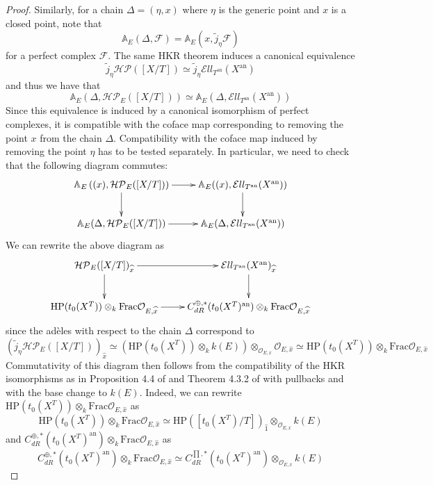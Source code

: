 \documentclass[11pt,letterpaper]{amsart}
\newcommand{\mHP}{\mathrm{HP}}
\newcommand{\bA}{\mathbb{A}}
\newcommand{\cF}{\mathcal{F}}
\newcommand{\cO}{\mathcal{O}}
\newcommand{\cHP}{\mathcal{HP}}
\newcommand{\El}{\mathcal{E}ll}
\newcommand{\an}{\mathrm{an}}
\newcommand{\Frac}{\mathrm{Frac}}
\begin{document}
\begin{proof}
Similarly, for a chain $\Delta=(\eta,x)$ where $\eta$ is the generic point and $x$ is a closed point, note that 
$$\bA_{E}(\Delta, \cF)=\bA_{E}(x, \tilde{j}_{\eta}\cF)$$
for a perfect complex $\cF$.
%
The same HKR theorem induces a canonical equivalence
$$\tilde{j}_{\eta}\cHP([X/T])\simeq\tilde{j}_{\eta}\El_{T^{\an}}(X^{\an})$$
and thus we have that 
$$\bA_{E}(\Delta, \cHP_E([X/T]))\simeq \bA_{E}\left (\Delta, \El_{T^{\an}}(X^{\an})\right )$$
Since this equivalence is induced by a canonical isomorphism of perfect complexes, it is compatible with the coface map corresponding to removing the point $x$ from the chain $\Delta$. Compatibility with the coface map induced by removing the point $\eta$ has to be tested separately. In particular, we need to check that the following diagram commutes:
$$\xymatrix{
\bA_{E}\left ((x), \cHP_E([X/T])\right )\ar[r]\ar[d] & \bA_{E}((x), \El_{T^{\an}}(X^{\an}))\ar[d] \\
\bA_{E}(\Delta, \cHP_E([X/T]))\ar[r] & \bA_{E}(\Delta, \El_{T^{\an}}(X^{\an}))
}
$$
We can rewrite the above diagram as
$$\xymatrix{
\cHP_E([X/T])_{\widehat{x}}\ar[r]\ar[d] & \El_{T^{\an}}(X^{\an})_{\widehat{x}}\ar[d] \\
\mHP(t_0(X^T))\otimes_{k}\Frac\cO_{E,\widehat{x}}\ar[r] & C_{dR}^{\oplus,\ast}(t_0(X^T)^\an)\otimes_{k}\Frac\cO_{E,\widehat{x}}
}
$$
since the ad\`eles with respect to the chain $\Delta$ correspond to
$$\left (\tilde{j}_{\eta}\cHP_E([X/T])\right )_{\widehat{x}}\simeq\left (\mHP(t_0(X^T))\otimes_{k}k(E)\right )\otimes_{\cO_{E,x}}\cO_{E,\widehat{x}}\simeq\mHP(t_0(X^T))\otimes_{k}\Frac\cO_{E,\widehat{x}}$$
Commutativity of this diagram then follows from the compatibility of the HKR isomorphisms as in Proposition 4.4 of \cite{BZNLoopConn} and Theorem 4.3.2 of \cite{HChen} with pullbacks and with the base change to $k(E)$. 
Indeed, we can rewrite $\mHP(t_0(X^T))\otimes_{k}\Frac\cO_{E,\widehat{x}}$ as 
$$\mHP(t_0(X^T))\otimes_{k}\Frac\cO_{E,\widehat{x}}\simeq\mHP([t_0(X^T)/T])_{\widehat{1}}\otimes_{\cO_{E,x}}k(E)$$
and $C_{dR}^{\oplus,\ast}(t_0(X^T)^\an)\otimes_{k}\Frac\cO_{E,\widehat{x}}$ as 
$$C_{dR}^{\oplus,\ast}(t_0(X^T)^\an)\otimes_{k}\Frac\cO_{E,\widehat{x}}\simeq C_{dR}^{\prod,\ast}(t_0(X^T)^\an)\otimes_{\cO_{E,x}}k(E)$$


\end{proof}
\end{document}
